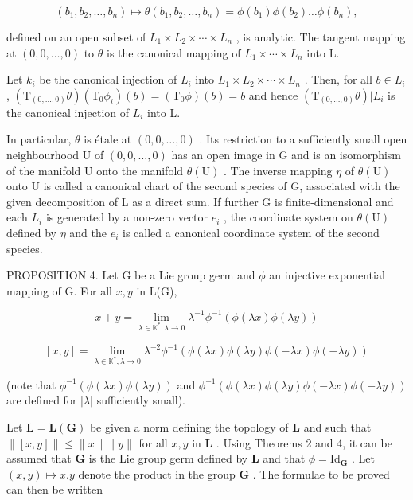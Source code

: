\[
(b _ {1}, b _ {2}, \dots , b _ {n}) \mapsto \theta (b _ {1}, b _ {2}, \dots , b _ {n}) = \phi (b _ {1}) \phi (b _ {2}) \dots \phi (b _ {n}),
\]

defined on an open subset of \(L_{1} \times L_{2} \times \cdots \times L_{n}\) , is analytic. The tangent mapping at \((0, 0, \ldots, 0)\) to \(\theta\) is the canonical mapping of \(L_{1} \times \cdots \times L_{n}\) into L.

Let \(k_{i}\) be the canonical injection of \(L_{i}\) into \(L_{1} \times L_{2} \times \cdots \times L_{n}\) . Then, for all \(b \in L_{i}\) , \((\mathrm{T}_{(0,\ldots,0)}\theta)(\mathrm{T}_{0}\phi_{i})(b) = (\mathrm{T}_{0}\phi)(b) = b\) and hence \((\mathrm{T}_{(0,\ldots,0)}\theta)|L_{i}\) is the canonical injection of \(L_{i}\) into L.

In particular, \(\theta\) is étale at \((0, 0, \ldots, 0)\) . Its restriction to a sufficiently small open neighbourhood U of \((0,0,\ldots,0)\) has an open image in G and is an isomorphism of the manifold U onto the manifold \(\theta(\mathrm{U})\) . The inverse mapping \(\eta\) of \(\theta(\mathrm{U})\) onto U is called a canonical chart of the second species of G, associated with the given decomposition of L as a direct sum. If further G is finite-dimensional and each \(L_{i}\) is generated by a non-zero vector \(e_{i}\) , the coordinate system on \(\theta(\mathrm{U})\) defined by \(\eta\) and the \(e_{i}\) is called a canonical coordinate system of the second species.

PROPOSITION 4. Let G be a Lie group germ and \(\phi\) an injective exponential mapping of G. For all \(x, y\) in L(G),


\[
x + y = \lim _ {\lambda \in \mathbb {K} ^ {*}, \lambda \rightarrow 0} \lambda^ {- 1} \phi^ {- 1} (\phi (\lambda x) \phi (\lambda y))\tag{1}
\]

\[
[ x, y ] = \lim _ {\lambda \in \mathbb {K} ^ {*}, \lambda \rightarrow 0} \lambda^ {- 2} \phi^ {- 1} (\phi (\lambda x) \phi (\lambda y) \phi (- \lambda x) \phi (- \lambda y))\tag{2}
\]

(note that \(\phi^{-1}(\phi(\lambda x)\phi(\lambda y))\) and \(\phi^{-1}(\phi(\lambda x)\phi(\lambda y)\phi(-\lambda x)\phi(-\lambda y))\) are defined for \(|\lambda|\) sufficiently small).

Let \(\mathbf{L} = \mathbf{L}(\mathbf{G})\) be given a norm defining the topology of \(\mathbf{L}\) and such that \(\| [x,y] \| \leqslant \| x \| \| y \|\) for all \(x, y\) in \(\mathbf{L}\) . Using Theorems 2 and 4, it can be assumed that \(\mathbf{G}\) is the Lie group germ defined by \(\mathbf{L}\) and that \(\phi = \mathrm{Id}_{\mathbf{G}}\) . Let \((x,y) \mapsto x.y\) denote the product in the group \(\mathbf{G}\) . The formulae to be proved can then be written


